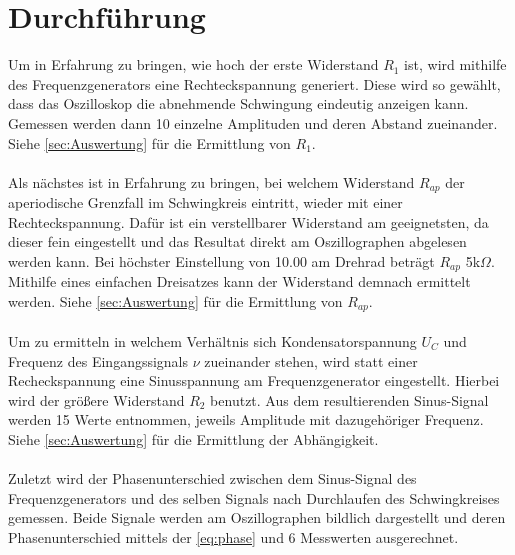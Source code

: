 \section{Durchführung}
\label{sec:Durchführung}

Um in Erfahrung zu bringen, wie hoch der erste Widerstand \(R_1\) ist, wird mithilfe des Frequenzgenerators eine Rechteckspannung generiert.
Diese wird so gewählt, dass das Oszilloskop die abnehmende Schwingung eindeutig anzeigen kann.
Gemessen werden dann 10 einzelne Amplituden und deren Abstand zueinander.
Siehe \autoref{sec:Auswertung} für die Ermittlung von \(R_1\).
\\\\
Als nächstes ist in Erfahrung zu bringen, bei welchem Widerstand \(R_{ap}\) der aperiodische Grenzfall im Schwingkreis eintritt, wieder mit einer Rechteckspannung.
Dafür ist ein verstellbarer Widerstand am geeignetsten, da dieser fein eingestellt und das Resultat direkt am Oszillographen abgelesen werden kann.
Bei höchster Einstellung von 10.00 am Drehrad beträgt \(R_{ap}\) 5k\(\Omega\). Mithilfe eines einfachen Dreisatzes kann der Widerstand demnach ermittelt werden.
Siehe \autoref{sec:Auswertung} für die Ermittlung von \(R_{ap}\).
\\\\
Um zu ermitteln in welchem Verhältnis sich Kondensatorspannung \(U_C\) und Frequenz des Eingangssignals \(\nu\) zueinander stehen, wird statt einer Recheckspannung eine Sinusspannung am Frequenzgenerator eingestellt.
Hierbei wird der größere Widerstand \(R_2\) benutzt.
Aus dem resultierenden Sinus-Signal werden 15 Werte entnommen, jeweils Amplitude mit dazugehöriger Frequenz.
Siehe \autoref{sec:Auswertung} für die Ermittlung der Abhängigkeit.
\\\\
Zuletzt wird der Phasenunterschied zwischen dem Sinus-Signal des Frequenzgenerators und des selben Signals nach Durchlaufen des Schwingkreises gemessen.
Beide Signale werden am Oszillographen bildlich dargestellt und deren Phasenunterschied mittels der \autoref{eq:phase} und 6 Messwerten ausgerechnet.